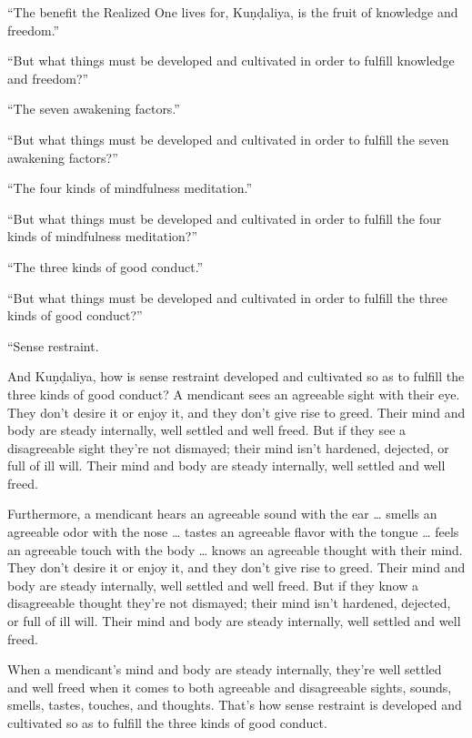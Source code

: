 \documentclass[12pt,openany]{book}%
\begin{document}
“The benefit the Realized One lives for, \textsanskrit{Kuṇḍaliya}, is the fruit of knowledge and freedom.” 

“But what things must be developed and cultivated in order to fulfill knowledge and freedom?” 

“The seven awakening factors.” 

“But what things must be developed and cultivated in order to fulfill the seven awakening factors?” 

“The four kinds of mindfulness meditation.” 

“But what things must be developed and cultivated in order to fulfill the four kinds of mindfulness meditation?” 

“The three kinds of good conduct.” 

“But what things must be developed and cultivated in order to fulfill the three kinds of good conduct?” 

“Sense restraint. 

And \textsanskrit{Kuṇḍaliya}, how is sense restraint developed and cultivated so as to fulfill the three kinds of good conduct? A mendicant sees an agreeable sight with their eye. They don’t desire it or enjoy it, and they don’t give rise to greed. Their mind and body are steady internally, well settled and well freed. But if they see a disagreeable sight they’re not dismayed; their mind isn’t hardened, dejected, or full of ill will. Their mind and body are steady internally, well settled and well freed. 

Furthermore, a mendicant hears an agreeable sound with the ear … smells an agreeable odor with the nose … tastes an agreeable flavor with the tongue … feels an agreeable touch with the body … knows an agreeable thought with their mind. They don’t desire it or enjoy it, and they don’t give rise to greed. Their mind and body are steady internally, well settled and well freed. But if they know a disagreeable thought they’re not dismayed; their mind isn’t hardened, dejected, or full of ill will. Their mind and body are steady internally, well settled and well freed. 

When a mendicant’s mind and body are steady internally, they’re well settled and well freed when it comes to both agreeable and disagreeable sights, sounds, smells, tastes, touches, and thoughts. That’s how sense restraint is developed and cultivated so as to fulfill the three kinds of good conduct. 
\end{document}
